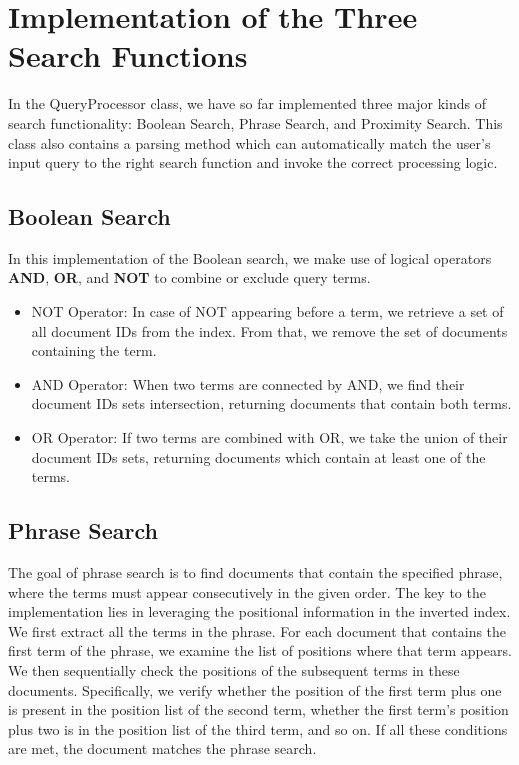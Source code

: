 \section{Implementation of the Three Search Functions}

In the QueryProcessor class, we have so far implemented three major kinds of search functionality: Boolean Search, Phrase Search, and Proximity Search. This class also contains a parsing method which can automatically match the user's input query to the right search function and invoke the correct processing logic.

\subsection*{Boolean Search}

In this implementation of the Boolean search, we make use of logical operators \textbf{AND}, \textbf{OR}, and \textbf{NOT} to combine or exclude query terms.

\begin{itemize}
    \item NOT Operator: In case of NOT appearing before a term, we retrieve a set of all document IDs from the index. From that, we remove the set of documents containing the term.
    \item AND Operator: When two terms are connected by AND, we find their document IDs sets intersection, returning documents that contain both terms.
    \item OR Operator: If two terms are combined with OR, we take the union of their document IDs sets, returning documents which contain at least one of the terms.
\end{itemize}

\subsection*{Phrase Search}

The goal of phrase search is to find documents that contain the specified phrase, where the terms must appear consecutively in the given order. The key to the implementation lies in leveraging the positional information in the inverted index. We first extract all the terms in the phrase. For each document that contains the first term of the phrase, we examine the list of positions where that term appears. We then sequentially check the positions of the subsequent terms in these documents. Specifically, we verify whether the position of the first term plus one is present in the position list of the second term, whether the first term's position plus two is in the position list of the third term, and so on. If all these conditions are met, the document matches the phrase search.

